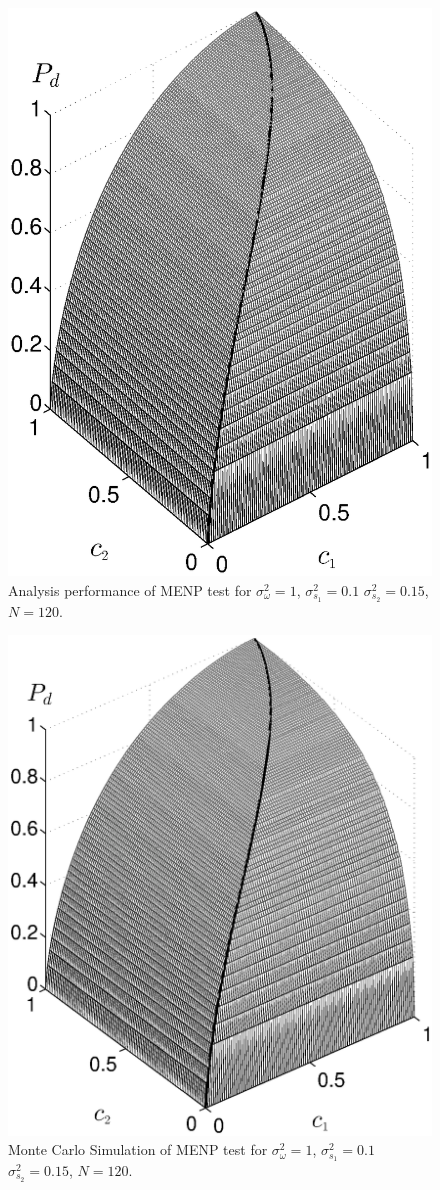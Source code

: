 \documentclass[12pt,journal,a4paper,twoside,doublecolumn]{IEEEtran}
\begin{document}
\begin{spacing}{1.0}
\begin{figure}[!t]
\centering
\includegraphics[width=12cm]{simu_chi2ROC.eps}
\caption{Analysis performance of MENP test for $\sigma_\omega^2=1$, $\sigma_{s_1}^2=0.1$ $\sigma_{s_2}^2 = 0.15$, $N=120$.}
\label{317}
\end{figure}

\begin{figure}[!t]
\centering
\includegraphics[width=12cm]{simu_c.eps}
\caption{Monte Carlo Simulation of MENP test for $\sigma_\omega^2=1$, $\sigma_{s_1}^2=0.1$ $\sigma_{s_2}^2 = 0.15$, $N=120$.}
\label{pic: simulation result}
\end{figure}

\end{spacing}
\end{document}
